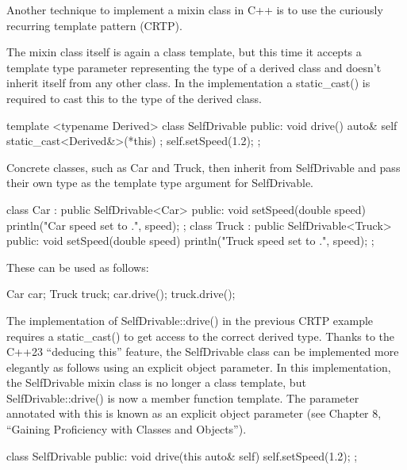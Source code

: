 
Another technique to implement a mixin class in C++ is to use the curiously recurring template pattern (CRTP).

The mixin class itself is again a class template, but this time it accepts a template type parameter representing the type of a derived class and doesn’t inherit itself from any other class. In the implementation a static\_cast() is required to cast this to the type of the derived class.

\begin{cpp}
template <typename Derived>
class SelfDrivable
{
    public:
        void drive()
        {
            auto& self { static_cast<Derived&>(*this) };
            self.setSpeed(1.2);
        }
};
\end{cpp}

Concrete classes, such as Car and Truck, then inherit from SelfDrivable and pass their own type as the template type argument for SelfDrivable.

\begin{cpp}
class Car : public SelfDrivable<Car>
{
    public:
        void setSpeed(double speed) { println("Car speed set to {}.", speed); }
};
class Truck : public SelfDrivable<Truck>
{
    public:
        void setSpeed(double speed) { println("Truck speed set to {}.", speed); }
};
\end{cpp}

These can be used as follows:

\begin{shell}
Car car;
Truck truck;
car.drive();
truck.drive();
\end{shell}



The implementation of SelfDrivable::drive() in the previous CRTP example requires a static\_cast() to get access to the correct derived type. Thanks to the C++23 “deducing this” feature, the SelfDrivable class can be implemented more elegantly as follows using an explicit object parameter. In this implementation, the SelfDrivable mixin class is no longer a class template, but SelfDrivable::drive() is now a member function template. The parameter annotated with this is known as an explicit object parameter (see Chapter 8, “Gaining Proficiency with Classes and Objects”).

\begin{cpp}
class SelfDrivable
{
    public:
        void drive(this auto& self) { self.setSpeed(1.2); }
};
\end{cpp}

